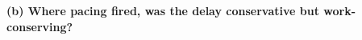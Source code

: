 \begin{table}[t]
{  \textbf{(b) Where pacing fired, was the delay conservative but
  work-conserving?}%
  \par\vspace{1pt}
  \newcommand{\rqthreesizetabular}{%
  \begin{tabular}{@{}%
      >{\raggedright\arraybackslash}p{47pt}|%
      >{\raggedleft\arraybackslash}p{16pt}%
      >{\raggedleft\arraybackslash}p{36pt}|%
      >{\raggedleft\arraybackslash}p{34pt}|%
      >{\raggedleft\arraybackslash}p{21pt}%
      >{\raggedleft\arraybackslash}p{21pt}|%
      >{\raggedleft\arraybackslash}p{19pt}%
      >{\raggedleft\arraybackslash}p{27pt}%
    @{}}
    \toprule
    \multirow[c]{2}{=}[-2.7pt]{\centering\textbf{Population}}

\end{tabular}}}
\end{table}
